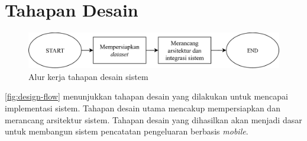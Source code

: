 \section{Tahapan Desain}
\label{sec:tahapan-desain}

\begin{figure}[htbp]
    \centering
    \includegraphics[width=1\textwidth]{images/design-flow.png}
    \caption{Alur kerja tahapan desain sistem}
    \label{fig:design-flow}
\end{figure}

\autoref{fig:design-flow} menunjukkan tahapan desain yang dilakukan untuk mencapai implementasi sistem. Tahapan desain utama mencakup mempersiapkan \dataset{} dan merancang arsitektur sistem. Tahapan desain yang dihasilkan akan menjadi dasar untuk membangun sistem pencatatan pengeluaran berbasis \emph{mobile}.



